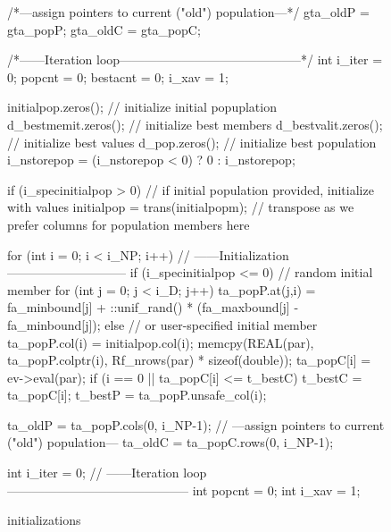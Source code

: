 \documentclass[nojss,shortnames,article]{jss}
\begin{document}
\begin{sidewaysfigure}
\begin{minipage}{0.56\linewidth}
    \begin{CodeChunk}
      \begin{CodeInput}

  /*---assign pointers to current ("old") population---*/
  gta_oldP = gta_popP;
  gta_oldC = gta_popC;
  
  /*------Iteration loop--------------------------------------------*/
  int i_iter = 0;
  popcnt = 0;
  bestacnt = 0;
  i_xav = 1;
      \end{CodeInput}
    \end{CodeChunk}

    \normalsize 
    \tiny 

    \bigskip
    \phantom{XX}
    \bigskip
    \phantom{XX}
    \bigskip
    \phantom{XX}
    \bigskip


    \begin{CodeChunk}
      \begin{CodeInput}
    initialpop.zeros();                         // initialize initial popuplation 
    d_bestmemit.zeros();                        // initialize best members
    d_bestvalit.zeros();                        // initialize best values 
    d_pop.zeros();                              // initialize best population
    i_nstorepop = (i_nstorepop < 0) ? 0 : i_nstorepop;
      
    if (i_specinitialpop > 0) {                 // if initial population provided, initialize with values 
        initialpop = trans(initialpopm);        // transpose as we prefer columns for population members here
    }

    for (int i = 0; i < i_NP; i++) {            // ------Initialization-----------------------------
        if (i_specinitialpop <= 0) {            // random initial member 
            for (int j = 0; j < i_D; j++) {
                ta_popP.at(j,i) = fa_minbound[j] + ::unif_rand() * (fa_maxbound[j] - fa_minbound[j]);
            }
        } else {                                // or user-specified initial member 
            ta_popP.col(i) = initialpop.col(i);
        } 
        memcpy(REAL(par), ta_popP.colptr(i), Rf_nrows(par) * sizeof(double));      
        ta_popC[i] = ev->eval(par);
        if (i == 0 || ta_popC[i] <= t_bestC) {
            t_bestC = ta_popC[i];
            t_bestP = ta_popP.unsafe_col(i);
        }
    }

    ta_oldP = ta_popP.cols(0, i_NP-1);          // ---assign pointers to current ("old") population---
    ta_oldC = ta_popC.rows(0, i_NP-1);
  
    int i_iter = 0;                             // ------Iteration loop--------------------------------------------
    int popcnt = 0;
    int i_xav = 1;
      \end{CodeInput}
    \end{CodeChunk}
    
    \normalsize 
  \end{minipage}
  \caption{ initializations}
  \label{fig:devol_init}
\end{sidewaysfigure}
\end{document}
